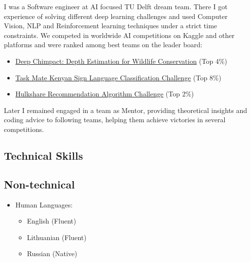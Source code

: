 \documentclass{article}
\begin{document}
{I was a Software engineer at AI focused TU Delft dream team. There I got experience of solving different deep learning challenges and used Computer Vision, NLP and Reinforcement learning techniques under a strict time constraints.  We competed in worldwide AI competitions on Kaggle and other platforms and were ranked among best teams on the leader board:
\begin{itemize}
    \item \href{https://www.drivendata.org/competitions/82/competition-wildlife-video-depth-estimation/}{Deep Chimpact: Depth Estimation for Wildlife Conservation} (Top 4\%)
    \item \href{https://zindi.africa/competitions/kenyan-sign-language-classification-challenge}{Task Mate Kenyan Sign Language Classification Challenge} (Top 8\%)
    \item \href{https://zindi.africa/competitions/hulkshare-recommendation-algorithm-challenge}{Hulkshare Recommendation Algorithm Challenge} (Top 2\%)
\end{itemize}
Later I remained engaged in a team as Mentor, providing theoretical insights and coding advice to following teams, helping them achieve victories in several competitions.
}
\begin{minipage}[t]{0.60\textwidth}
\subsection{Technical Skills}

\end{minipage}
\begin{minipage}[t]{0.4\textwidth}
\subsection{Non-technical}
\begin{itemize}
    \item Human Languages:
    \begin{itemize}
        \item English (Fluent)
        \item Lithuanian (Fluent)
        \item Russian (Native)
    \end{itemize}
\end{itemize}
\end{minipage}
\end{document}
